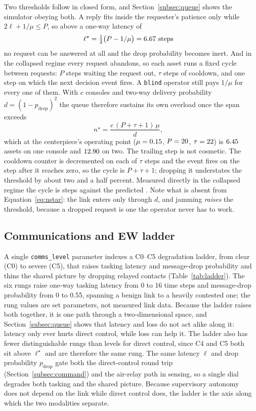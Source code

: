 \documentclass[11pt]{article}
\begin{document}
Two thresholds follow in closed form, and Section~\ref{subsec:queue} shows the simulator obeying both. A reply fits inside the requester's patience only while $2\ell + 1/\mu \le P$, so above a one-way latency of
\[
\ell^{\star} = \tfrac{1}{2}\big(P - 1/\mu\big) = 6.67{}\text{ steps}
\]
no request can be answered at all and the drop probability becomes inert. And in the collapsed regime every request abandons, so each asset runs a fixed cycle between requests: $P$ steps waiting the request out, $\tau$ steps of cooldown, and one step on which the next decision event fires. A \texttt{blind} operator still pays $1/\mu$ for every one of them. With $c$ consoles and two-way delivery probability $d = (1-p_{\text{drop}})^2$ the queue therefore sustains its own overload once the span exceeds
\begin{equation}
\label{eq:nstar}
n^{\star} = \frac{c\,(P + \tau + 1)\,\mu}{d},
\end{equation}
which at the centerpiece's operating point ($\mu = 0.15{}$, $P = 20{}$, $\tau = 22{}$) is $6.45{}$ assets on one console and $12.90{}$ on two. The trailing step is not cosmetic. The cooldown counter is decremented on each of $\tau$ steps and the event fires on the step after it reaches zero, so the cycle is $P + \tau + 1$; dropping it understates the threshold by about two and a half percent. Measured directly in the collapsed regime the cycle is \qCycleMeasured{} steps against the predicted \qCyclePredicted{}. Note what is absent from Equation~\ref{eq:nstar}: the link enters only through $d$, and jamming \emph{raises} the threshold, because a dropped request is one the operator never has to work.

\subsection{Communications and EW ladder}
\label{subsec:comms}
A single \texttt{comms\_level} parameter indexes a C0--C5 degradation ladder, from clear (C0) to severe (C5), that raises tasking latency and message-drop probability and thins the shared picture by dropping relayed contacts (Table~\ref{tab:ladder}). The six rungs raise one-way tasking latency from 0 to 16 time steps and message-drop probability from 0 to 0.55, spanning a benign link to a heavily contested one; the rung values are set parameters, not measured link data. Because the ladder raises both together, it is one path through a two-dimensional space, and Section~\ref{subsec:queue} shows that latency and loss do not act alike along it: latency only ever hurts direct control, while loss can help it. The ladder also has fewer distinguishable rungs than levels for direct control, since C4 and C5 both sit above $\ell^{\star}$ and are therefore the same rung. The same latency $\ell$ and drop probability $p_{\text{drop}}$ gate both the direct-control round trip (Section~\ref{subsec:command}) and the air-relay path in sensing, so a single dial degrades both tasking and the shared picture. Because supervisory autonomy does not depend on the link while direct control does, the ladder is the axis along which the two modalities separate.
\end{document}
